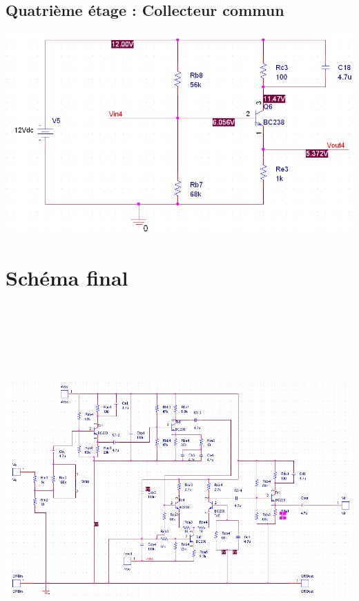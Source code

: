 \documentclass[11pt;a4paper]{report}
\begin{document}
   \subsection{Quatrième étage : Collecteur commun}
    \begin{center}
     \includegraphics[width=17cm]{images/etage4.PNG}
    \end{center}

  \section{Schéma final}
   \begin{center}
    \includegraphics[height=14cm,angle=90]{images/projet1.PNG}
   \end{center}
\end{document}

